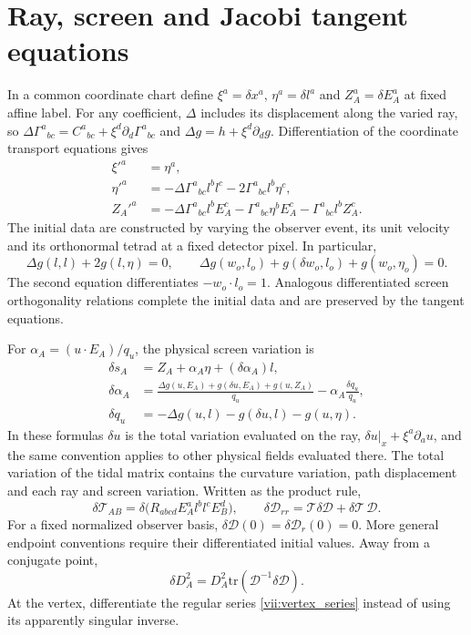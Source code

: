 \section{Ray, screen and Jacobi tangent equations}
In a common coordinate chart define $\xi^a=\delta x^a$, $\eta^a=\delta l^a$ and $Z_A^a=\delta E_A^a$ at fixed affine label. For any coefficient, $\Delta$ includes its displacement along the varied ray, so $\Delta\Gamma^a{}_{bc}=C^a{}_{bc}+\xi^d\partial_d\Gamma^a{}_{bc}$ and $\Delta g=h+\xi^d\partial_dg$. Differentiation of the coordinate transport equations gives
\begin{align}
\xi'^a&=\eta^a,\label{vii:ray_tangent_x}\\
\eta'^a&=-\Delta\Gamma^a{}_{bc}l^bl^c-2\Gamma^a{}_{bc}l^b\eta^c,\label{vii:ray_tangent_l}\\
Z_A'^a&=-\Delta\Gamma^a{}_{bc}l^bE_A^c
-\Gamma^a{}_{bc}\eta^bE_A^c-\Gamma^a{}_{bc}l^bZ_A^c.\label{vii:screen_tangent}
\end{align}
The initial data are constructed by varying the observer event, its unit velocity and its orthonormal tetrad at a fixed detector pixel. In particular,
\begin{equation}\label{vii:tangent_initial_constraints}
\Delta g(l,l)+2g(l,\eta)=0,\qquad
\Delta g(w_o,l_o)+g(\delta w_o,l_o)+g(w_o,\eta_o)=0.
\end{equation}
The second equation differentiates $-w_o\cdot l_o=1$. Analogous differentiated screen orthogonality relations complete the initial data and are preserved by the tangent equations.

For $\alpha_A=(u\cdot E_A)/q_u$, the physical screen variation is
\begin{align}
\delta s_A&=Z_A+\alpha_A\eta+(\delta\alpha_A)l,\label{vii:physical_screen_tangent}\\
\delta\alpha_A&=\frac{\Delta g(u,E_A)+g(\delta u,E_A)+g(u,Z_A)}{q_u}
-\alpha_A\frac{\delta q_u}{q_u},\label{vii:alpha_tangent}\\
\delta q_u&=-\Delta g(u,l)-g(\delta u,l)-g(u,\eta).\label{vii:q_tangent}
\end{align}
In these formulas $\delta u$ is the total variation evaluated on the ray, $\delta u|_x+\xi^a\partial_a u$, and the same convention applies to other physical fields evaluated there. The total variation of the tidal matrix contains the curvature variation, path displacement and each ray and screen variation. Written as the product rule,
\begin{equation}\label{vii:tidal_tangent}
\delta\mathcal T_{AB}=\delta\big(R_{abcd}E_A^al^bl^cE_B^d\big),
\qquad
\delta\mathcal D_{rr}=\mathcal T\delta\mathcal D+\delta\mathcal T\,\mathcal D.
\end{equation}
For a fixed normalized observer basis, $\delta\mathcal D(0)=\delta\mathcal D_r(0)=0$. More general endpoint conventions require their differentiated initial values. Away from a conjugate point,
\begin{equation}\label{vii:area_tangent}
\delta D_A^2=D_A^2\mathrm{tr}(\mathcal D^{-1}\delta\mathcal D).
\end{equation}
At the vertex, differentiate the regular series \eqref{vii:vertex_series} instead of using its apparently singular inverse.


